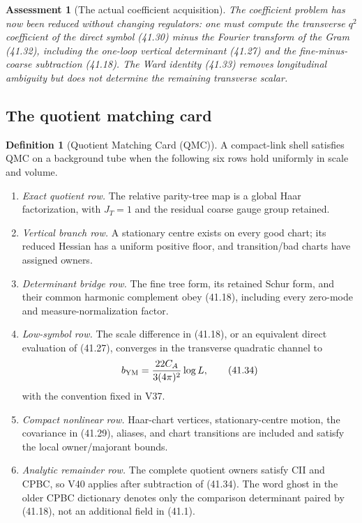 \documentclass[11pt,oneside]{book}
\newtheorem{assessment}[theorem]{Assessment}
\theoremstyle{definition}
\newtheorem{definition}[theorem]{Definition}
\theoremstyle{remark}
\begin{document}
\begin{assessment}[The actual coefficient acquisition]
\label{ass:e8v41-score-acquisition}
The coefficient problem has now been reduced without changing
regulators: one must compute the transverse \(q^2\) coefficient of
the direct symbol (41.30) minus the Fourier transform of the Gram
(41.32), including the one-loop vertical determinant (41.27) and
the fine-minus-coarse subtraction (41.18).  The Ward identity
(41.33) removes longitudinal ambiguity but does not determine the
remaining transverse scalar.
\end{assessment}

\subsection{The quotient matching card}

\begin{definition}[Quotient Matching Card (QMC)]
\label{def:e8v41-QMC}
A compact-link shell satisfies QMC on a background tube when the
following six rows hold uniformly in scale and volume.
\begin{enumerate}
\item \emph{Exact quotient row.}  The relative parity-tree map is a
      global Haar factorization, with \(J_T=1\) and the residual
      coarse gauge group retained.
\item \emph{Vertical branch row.}  A stationary centre exists on
      every good chart; its reduced Hessian has a uniform positive
      floor, and transition/bad charts have assigned owners.
\item \emph{Determinant bridge row.}  The fine tree form, its
      retained Schur form, and their common harmonic complement obey
      (41.18), including every zero-mode and measure-normalization
      factor.
\item \emph{Low-symbol row.}  The scale difference in (41.18), or an
      equivalent direct evaluation of (41.27), converges in the
      transverse quadratic channel to
      \[
       b_{\rm YM}=\frac{22C_A}{3(4\pi)^2}\log L,                 \tag{41.34}
      \]
      with the convention fixed in V37.
\item \emph{Compact nonlinear row.}  Haar-chart vertices,
      stationary-centre motion, the covariance in (41.29), aliases,
      and chart transitions are included and satisfy the local
      owner/majorant bounds.
\item \emph{Analytic remainder row.}  The complete quotient owners
      satisfy CII and CPBC, so V40 applies after subtraction of
      (41.34).  The word ghost in the older CPBC dictionary denotes
      only the comparison determinant paired by (41.18), not an
      additional field in (41.1).
\end{enumerate}
\end{definition}
\end{document}
